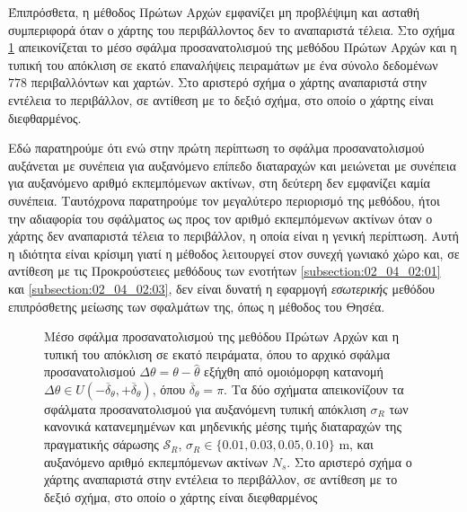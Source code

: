 Έπιπρόσθετα, η μέθοδος Πρώτων Αρχών εμφανίζει μη προβλέψιμη και ασταθή
συμπεριφορά όταν ο χάρτης του περιβάλλοντος δεν το αναπαριστά τέλεια. Στο σχήμα
\ref{fig:02_04_02:errorbar_x1} απεικονίζεται το μέσο σφάλμα προσανατολισμού της
μεθόδου Πρώτων Αρχών και η τυπική του απόκλιση σε εκατό επαναλήψεις πειραμάτων
με ένα σύνολο δεδομένων $778$ περιβαλλόντων και χαρτών. Στο αριστερό σχήμα ο
χάρτης αναπαριστά στην εντέλεια το περιβάλλον, σε αντίθεση με το δεξιό σχήμα,
στο οποίο ο χάρτης είναι διεφθαρμένος.

Εδώ παρατηρούμε ότι ενώ στην πρώτη περίπτωση το σφάλμα προσανατολισμού
αυξάνεται με συνέπεια για αυξανόμενο επίπεδο διαταραχών και μειώνεται με
συνέπεια για αυξανόμενο αριθμό εκπεμπόμενων ακτίνων, στη δεύτερη δεν εμφανίζει
καμία συνέπεια. Ταυτόχρονα παρατηρούμε τον μεγαλύτερο περιορισμό της μεθόδου,
ήτοι την αδιαφορία του σφάλματος ως προς τον αριθμό εκπεμπόμενων ακτίνων όταν
ο χάρτης δεν αναπαριστά τέλεια το περιβάλλον, η οποία είναι η γενική περίπτωση.
Αυτή η ιδιότητα είναι κρίσιμη γιατί η μέθοδος λειτουργεί στον συνεχή γωνιακό
χώρο και, σε αντίθεση με τις Προκρούστειες μεθόδους των ενοτήτων
\ref{subsection:02_04_02:01} και \ref{subsection:02_04_02:03}, δεν είναι δυνατή
η εφαρμογή \textit{εσωτερικής} μεθόδου επιπρόσθετης μείωσης των σφαλμάτων της,
όπως η μέθοδος του Θησέα.

\begin{figure}[!h]\centering
  \vspace{2cm}
  
  \vspace{1cm}
  \caption{\small Μέσο σφάλμα προσανατολισμού της μεθόδου Πρώτων Αρχών και η
           τυπική του απόκλιση σε εκατό πειράματα, όπου το αρχικό σφάλμα
           προσανατολισμού $\Delta \theta = \theta-\hat{\theta}$ εξήχθη από
           ομοιόμορφη κατανομή $\Delta \theta \in
           U(-\overline{\delta}_{\theta}, +\overline{\delta}_{\theta})$, όπου
           $\overline{\delta}_{\theta} = \pi$. Τα δύο σχήματα απεικονίζουν τα
           σφάλματα προσανατολισμού για αυξανόμενη τυπική απόκλιση $\sigma_R$
           των κανονικά κατανεμημένων και μηδενικής μέσης τιμής διαταραχών της
           πραγματικής σάρωσης
           $\mathcal{S}_R$, $\sigma_R \in \{0.01,0.03,0.05,0.10\}$ m, και
           αυξανόμενο αριθμό εκπεμπόμενων ακτίνων $N_s$. Στο αριστερό σχήμα ο
           χάρτης αναπαριστά στην εντέλεια το περιβάλλον, σε αντίθεση με το
           δεξιό σχήμα, στο οποίο ο χάρτης είναι διεφθαρμένος}
  \label{fig:02_04_02:errorbar_x1}
\end{figure}

